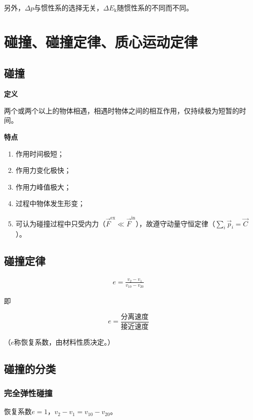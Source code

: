 \documentclass[
	12pt, %
	a4paper, %
]{myLegrandOrangeBook}
\begin{document}
另外，\(\Delta p\)与惯性系的选择无关，\(\Delta E_{\mathrm{k}}\)随惯性系的不同而不同。

\section{碰撞、碰撞定律、质心运动定律}

\subsection{碰撞}

\textbf{定义}

两个或两个以上的物体相遇，相遇时物体之间的相互作用，仅持续极为短暂的时间。

\textbf{特点}

\begin{enumerate}
    \item 作用时间极短；
    \item 作用力变化极快；
    \item 作用力峰值极大；
    \item 过程中物体发生形变；
    \item 可认为碰撞过程中只受内力（\(\overrightarrow{F}^{\mathrm{ex}} \ll \overrightarrow{F}^{\mathrm{in}}\)），故遵守动量守恒定律（\(\sum_{i} \overrightarrow{p}_{i} = \overrightarrow{C}\)）。
\end{enumerate}

\subsection{碰撞定律}

\begin{align}
    e = \frac{v_2 - v_1}{v_{10} - v_{20}}
\end{align}

即

$$
e = \frac{\text{分离速度}}{\text{接近速度}}
$$

（\(e\)称恢复系数，由材料性质决定。）

\subsection{碰撞的分类}

\subsubsection*{完全弹性碰撞}

恢复系数\(e=1\)，\(v_2-v_1=v_{10} - v_{20}\)。
\end{document}
